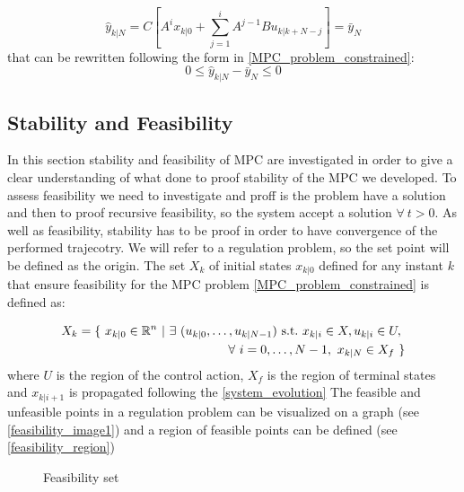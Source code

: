 \begin{equation}
\hat{y}_{k|N}=C\left[A^i x_{k|0} + \sum_{j=1}^{i} A^{j-1}Bu_{k|k+N-j}\right]=\bar{y}_N
\end{equation}
that can be rewritten following the form in \ref{MPC_problem_constrained}: 
\begin{equation}
0 \leq \hat{y}_{k|N}-\bar{y}_N \leq 0
\end{equation} 

\subsection{Stability and Feasibility}

In this section stability and feasibility of MPC are investigated in order to give a clear understanding of what done to proof stability of the MPC we developed. To assess feasibility we need to investigate and proff is the problem have a solution and then to proof recursive feasibility, so the system accept a solution $\forall\  t>0$. As well as feasibility, stability has to be proof in order to have convergence of the performed trajecotry. We will refer to a regulation problem, so the set point will be defined as the origin.
The set $X_{k}$ of initial states $x_{k|0}$ defined for any instant $k$ that ensure feasibility for the MPC problem \ref{MPC_problem_constrained} is defined as:

\begin{equation}
	\begin{split}
		X_{k}=\lbrace\ x_{k|0}\in\mathbb{R}^n\ |\ \exists\  (u_{k|0}, \dots , u_{k|N-1})\ \textnormal{s.t.}\ x_{k|i} \in X, u_{k|i} \in U,\ &  \\ 
		\forall\  i=0,\dots,N-1,\ x_{k|N} \in X_f\ \rbrace& \\ 
	\end{split}
\end{equation}
where $U$ is the region of the control action, $X_f$ is the region of terminal states and $x_{k|i+1}$ is propagated following the \ref{system_evolution}
 The feasible and unfeasible points in a regulation problem can be visualized on a graph (see \ref{feasibility_image1}) and a region of feasible points can be defined (see \ref{feasibility_region})

 \begin{figure}%
\centering
{}%
\qquad
{}%
\caption{Feasibility set}
\end{figure}


